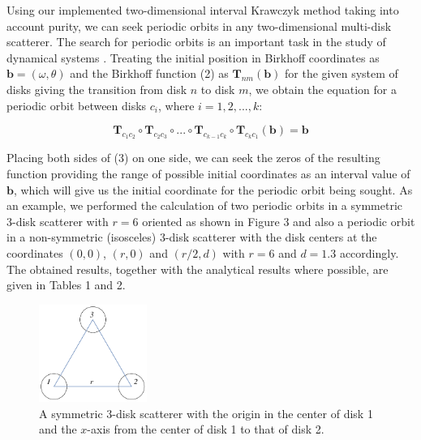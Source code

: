 \documentclass[pre, amsmath, amssymb, onecolumn, showpacs]{revtex4-1}
\begin{document}
Using our implemented two-dimensional interval Krawczyk method taking into account purity, we can seek periodic orbits in any two-dimensional multi-disk scatterer. The search for periodic orbits is an important task in the study of dynamical systems \cite{artin1965periodic, block1980periodic, newhouse1977quasi, chothi1997s}. Treating the initial position in Birkhoff coordinates as $\textbf{b} = (\omega, \theta)$ and the Birkhoff function (2) as $\textbf{T}_{nm}(\textbf{b})$ for the given system of disks giving the transition from disk $n$ to disk $m$, we obtain the equation for a periodic orbit between disks $c_i$, where $i = 1, 2, ..., k$:

\begin{equation}
\textbf{T}_{c_1 c_2} \circ \textbf{T}_{c_2 c_3} \circ ... \circ \textbf{T}_{c_{k-1} c_k} \circ \textbf{T}_{c_k c_1} (\textbf{b}) = \textbf{b}
\end{equation}

Placing both sides of (3) on one side, we can seek the zeros of the resulting function providing the range of possible initial coordinates as an interval value of $\textbf{b}$, which will give us the initial coordinate for the periodic orbit being sought. As an example, we performed the calculation of two periodic orbits in a symmetric 3-disk scatterer with $r = 6$ oriented as shown in Figure 3 and also a periodic orbit in a non-symmetric (isosceles) 3-disk scatterer with the disk centers at the coordinates $(0, 0)$, $(r, 0)$ and $(r/2, d)$ with $r = 6$ and $d = 1.3$ accordingly. The obtained results, together with the analytical results where possible, are given in Tables 1 and 2.

\begin{figure}
\centering
\includegraphics*[width=100pt]{figure-3disks.pdf}
\caption{A symmetric 3-disk scatterer with the origin in the center of disk 1 and the $x$-axis from the center of disk 1 to that of disk 2.}
\label{fig03}
\end{figure}
\end{document}
